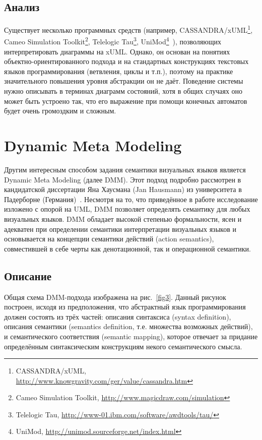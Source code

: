 \documentclass[a5paper]{article}
\begin{document}
\subsection{Анализ}

Существует несколько программных средств (например, CASSANDRA/xUML\footnote{CASSANDRA/xUML, \url{http://www.knowgravity.com/ger/value/cassandra.htm}}, Cameo Simulation Toolkit\footnote{Cameo Simulation Toolkit, \url{http://www.magicdraw.com/simulation}}, Telelogic Tau\footnote{Telelogic Tau, \url{http://www-01.ibm.com/software/awdtools/tau/}}, UniMod\footnote{UniMod, \url{http://unimod.sourceforge.net/index.html}}~\cite{unimod}), позволяющих интерпретировать диаграммы на xUML. Однако, он основан на понятиях объектно-ориентированного подхода и на стандартных конструкциях текстовых языков программирования (ветвления, циклы и т.п.), поэтому на практике значительного повышения уровня абстракции он не даёт. Поведение системы нужно описывать в терминах диаграмм состояний, хотя в общих случаях оно может быть устроено так, что его выражение при помощи конечных автоматов будет очень громоздким и сложным.

\section{Dynamic Meta Modeling}

Другим интересным способом задания семантики визуальных языков является Dynamic Meta Modeling (далее DMM). Этот подход подробно рассмотрен в кандидатской диссертации Яна Хаусмана (Jan Hausmann) из университета в Падерборне (Германия)~\cite{dmm2}. Несмотря на то, что приведённое в работе исследование изложено с опорой на UML, DMM позволяет определять семантику для любых визуальных языков. DMM обладает высокой степенью формальности, ясен и адекватен при определении семантики интерпретации визуальных языков и основывается на концепции семантики действий (action semantics), совместившей в себе черты как денотационной, так и операционной семантики.

\subsection{Описание}

Общая схема DMM-подхода изображена на рис.~\ref{fig3}. Данный рисунок построен, исходя из предположения, что абстрактный язык программирования должен состоять из трёх частей: описания синтаксиса (syntax definition), описания семантики (semantics definition, т.е. множества возможных действий), и семантического соответствия (semantic mapping), которое отвечает за придание определённым синтаксическим конструкциям некого семантического смысла.
\end{document}
